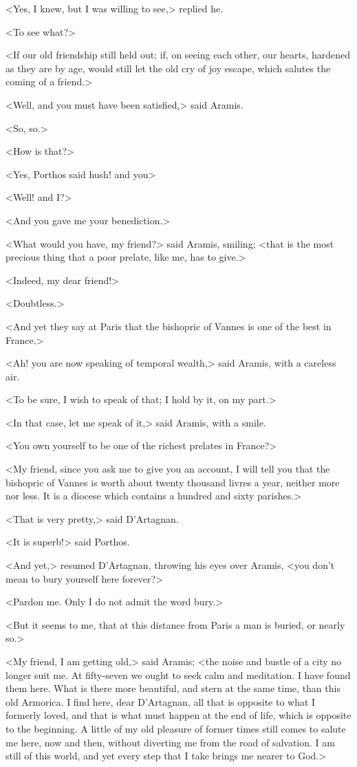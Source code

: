 <Yes, I knew, but I was willing to see,> replied he.

<To see what?>

<If our old friendship still held out; if, on seeing each other, our hearts, hardened as they are by age, would still let the old cry of joy escape, which salutes the coming of a friend.>

<Well, and you must have been satisfied,> said Aramis.

<So, so.>

<How is that?>

<Yes, Porthos said hush! and you\longdash>

<Well! and I\@?>

<And you gave me your benediction.>

<What would you have, my friend?> said Aramis, smiling; <that is the most precious thing that a poor prelate, like me, has to give.>

<Indeed, my dear friend!>

<Doubtless.>

<And yet they say at Paris that the bishopric of Vannes is one of the best in France.>

<Ah! you are now speaking of temporal wealth,> said Aramis, with a careless air.

<To be sure, I wish to speak of that; I hold by it, on my part.>

<In that case, let me speak of it,> said Aramis, with a smile.

<You own yourself to be one of the richest prelates in France?>

<My friend, since you ask me to give you an account, I will tell you that the bishopric of Vannes is worth about twenty thousand livres a year, neither more nor less. It is a diocese which contains a hundred and sixty parishes.>

<That is very pretty,> said D'Artagnan.

<It is superb!> said Porthos.

<And yet,> resumed D'Artagnan, throwing his eyes over Aramis, <you don't mean to bury yourself here forever?>

<Pardon me. Only I do not admit the word bury.>

<But it seems to me, that at this distance from Paris a man is buried, or nearly so.>

<My friend, I am getting old,> said Aramis; <the noise and bustle of a city no longer suit me. At fifty-seven we ought to seek calm and meditation. I have found them here. What is there more beautiful, and stern at the same time, than this old Armorica. I find here, dear D'Artagnan, all that is opposite to what I formerly loved, and that is what must happen at the end of life, which is opposite to the beginning. A little of my old pleasure of former times still comes to salute me here, now and then, without diverting me from the road of salvation. I am still of this world, and yet every step that I take brings me nearer to God.>

